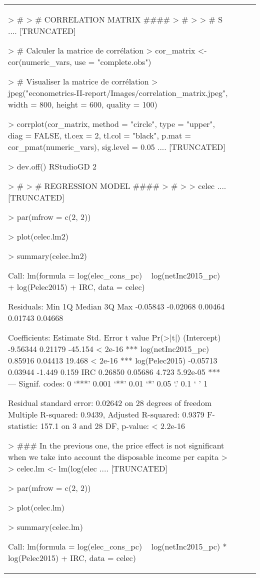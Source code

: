 \begin{table}[h]
\begin{tabular}{lccc}
> # %
> # CORRELATION MATRIX ####
> # %
> 
> # S .... [TRUNCATED] 

> # Calculer la matrice de corrélation
> cor_matrix <- cor(numeric_vars, use = "complete.obs")

> # Visualiser la matrice de corrélation
> jpeg("econometrics-II-report/Images/correlation_matrix.jpeg", width = 800, height = 600, quality = 100)

> corrplot(cor_matrix, method = "circle", type = "upper", diag = FALSE, tl.cex = 2, tl.col = "black", p.mat = cor_pmat(numeric_vars), sig.level = 0.05 .... [TRUNCATED] 

> dev.off()
RStudioGD 
        2 

> # %
> # REGRESSION MODEL ####
> # %
> 
> celec .... [TRUNCATED] 

> par(mfrow = c(2, 2))

> plot(celec.lm2)

> summary(celec.lm2)

Call:
lm(formula = log(elec_cons_pc) ~ log(netInc2015_pc) + log(Pelec2015) + 
    IRC, data = celec)

Residuals:
     Min       1Q   Median       3Q      Max 
-0.05843 -0.02068  0.00464  0.01743  0.04668 

Coefficients:
                   Estimate Std. Error t value Pr(>|t|)    
(Intercept)        -9.56344    0.21179 -45.154  < 2e-16 ***
log(netInc2015_pc)  0.85916    0.04413  19.468  < 2e-16 ***
log(Pelec2015)     -0.05713    0.03944  -1.449    0.159    
IRC                 0.26850    0.05686   4.723 5.92e-05 ***
---
Signif. codes:  0 ‘***’ 0.001 ‘**’ 0.01 ‘*’ 0.05 ‘.’ 0.1 ‘ ’ 1

Residual standard error: 0.02642 on 28 degrees of freedom
Multiple R-squared:  0.9439,	Adjusted R-squared:  0.9379 
F-statistic: 157.1 on 3 and 28 DF,  p-value: < 2.2e-16


> ### In the previous one, the price effect is not significant when we take into account the disposable income per capita
> 
> celec.lm <- lm(log(elec .... [TRUNCATED] 

> par(mfrow = c(2, 2))

> plot(celec.lm)

> summary(celec.lm)

Call:
lm(formula = log(elec_cons_pc) ~ log(netInc2015_pc) * log(Pelec2015) + 
    IRC, data = celec)


\end{tabular}
\end{table}
